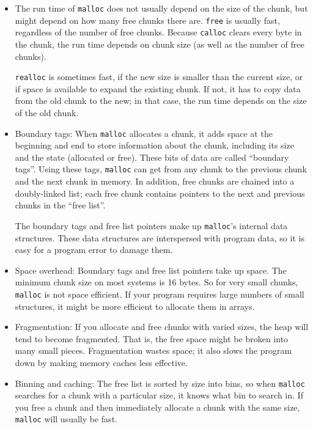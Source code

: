 \documentclass[12pt]{book}
\begin{document}
\begin{itemize}

\item The run time of {\tt malloc} does not usually depend on the
size of the chunk, but might depend on how many free chunks there
are.  {\tt free} is usually fast, regardless of the number of
free chunks.  Because {\tt calloc} clears every byte in the chunk,
the run time depends on chunk size (as well as the number of free
chunks).

{\tt realloc} is sometimes fast, if the new size is smaller than the
current size, or if space is available to expand the existing chunk.
If not, it has to copy data from the old chunk to the new; in that
case, the run time depends on the size of the old chunk.

\item Boundary tags: When {\tt malloc} allocates a chunk, it adds
  space at the beginning and end to store information about the chunk,
  including its size and the state (allocated or free).  These bits of
  data are called ``boundary tags''.  Using these tags, {\tt malloc}
  can get from any chunk to the previous chunk and the next chunk in
  memory.  In addition, free chunks are chained into a doubly-linked
  list; each free chunk contains pointers to the next and previous
  chunks in the ``free list''.

The boundary tags and free list pointers make up {\tt malloc}'s
internal data structures.  These data structures are interspersed with
program data, so it is easy for a program error to damage them.

\item Space overhead: Boundary tags and free list pointers take up
  space.  The minimum chunk size on most systems is 16 bytes.  So for
  very small chunks, {\tt malloc} is not space efficient.  If your
  program requires large numbers of small structures, it might be more
  efficient to allocate them in arrays.

\item Fragmentation: If you allocate and free chunks with varied
  sizes, the heap will tend to become fragmented.  That is, the free
  space might be broken into many small pieces.  Fragmentation wastes
  space; it also slows the program down by making memory caches less
  effective.

\item Binning and caching: The free list is sorted by size into bins,
  so when {\tt malloc} searches for a chunk with a particular size, it
  knows what bin to search in.  If you free a chunk and then
  immediately allocate a chunk with the same size, {\tt malloc} will
  usually be fast.

\end{itemize}
\end{document}

